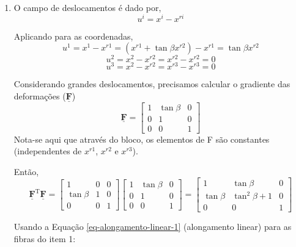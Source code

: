 \begin{enumerate}
    \item 

    O campo de deslocamentos é dado por,
    \[u^i=x^i-x^{ri}\]

    Aplicando para as coordenadas,
    \[u^1=x^1-x^{r1}=(x^{r1}+\tan\beta x^{r2})-x^{r1}=\tan\beta x^{r2}\]
    \[u^2=x^2-x^{r2}=x^{r2}-x^{r2}=0\]
    \[u^3=x^2-x^{r2}=x^{r3}-x^{r3}=0\]

    Considerando grandes deslocamentos, precisamos calcular o gradiente das deformações ($\underline{\mathbf{F}}$)
    \[
        \underline{\mathbf{F}}
        =
        \begin{bmatrix}
            1 & \tan\beta & 0 \\
            0 & 1 & 0 \\
            0 & 0 & 1
        \end{bmatrix}			
    \]
    Nota-se aqui que através do bloco, os elementos de F são constantes (independentes de $x^{r1}$, $x^{r2}$ e $x^{r3}$).

    Então,
    \[
        \underline{\mathbf{F}}^{\text{T}}\underline{\mathbf{F}}
        =
        \begin{bmatrix}
            1 & 0 & 0 \\
            \tan\beta & 1 & 0 \\
            0 & 0 & 1
        \end{bmatrix}
        \begin{bmatrix}
            1 & \tan\beta & 0 \\
            0 & 1 & 0 \\
            0 & 0 & 1
        \end{bmatrix}
        =
        \begin{bmatrix}
            1 & \tan\beta & 0 \\
            \tan\beta & \tan^2\beta + 1 & 0 \\
            0 & 0 & 1
        \end{bmatrix}
    \]

    Usando a Equação \eqref{eq-alongamento-linear-1} (alongamento linear) para as fibras do item 1:


\end{enumerate}
